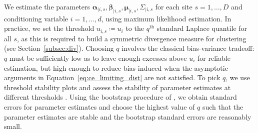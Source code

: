 \documentclass[12pt]{article}
\begin{document}
We estimate the parameters $\symbf{\alpha}_{\mid i, s}, \symbf{\beta}_{\mid i, s}, \symbf{\mu}_{\mid i, s}, \Sigma_{\mid i, s}$ for each site $s = 1, \ldots, D$ and conditioning 
variable $i = 1, \ldots, d$, using maximum likelihood estimation. 
In practice, we set the threshold $u_{i, s} \coloneqq u_i$ to the $q^{\text{th}}$ standard Laplace quantile for all $s$, as this is required to build a symmetric divergence measure for clustering (see Section~\ref{subsec:div}).
Choosing $q$ involves the classical bias-variance tradeoff: $q$ must be sufficiently low as to leave enough excesses above $u_i$ for reliable estimation, but high enough to reduce bias induced when the asymptotic arguments in Equation~\eqref{eq:ce_limiting_dist} are not satisfied. 
To pick $q$, we use threshold stability plots and assess the stability of parameter estimates at different thresholds \citep{Southworth2012}. 
Using the bootstrap procedure of \citet{Heffernan2004}, we obtain standard errors for parameter estimates and choose the highest value of $q$ such that the parameter estimates are stable and the bootstrap standard errors are reasonably small. 
\end{document}
